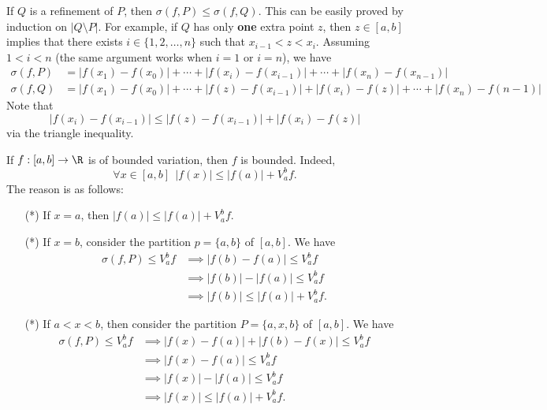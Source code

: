 \begin{remark}
    If \( Q  \) is a refinement of \( P \), then \( \sigma(f,P) \leq \sigma(f,Q) \). This can be easily proved by induction on \( | Q \setminus  P  |  \). For example, if \( Q  \) has only \textbf{one} extra point \( z  \), then \( z \in [a,b] \) implies that there exists \( i \in \{ 1,2, \dots, n  \}  \) such that \( {x}_{i-1 } < z < {x}_{i} \). Assuming \( 1 < i < n  \) (the same argument works when \( i = 1  \) or \( i = n  \)), we have   
    \begin{align*}
        \sigma(f,P) &= | f({x}_{1}) - f({x}_{0}) |  + \cdots + | f({x}_{i}) - f({x}_{i-1}) |  + \cdots + | f({x}_{n}) - f({x}_{n-1}) |  \\
        \sigma(f,Q) &= | f({x}_{1}) - f({x}_{0}) |  + \cdots + | f(z ) - f({x}_{i-1}) |  + | f({x}_{i}) - f(z)  |  + \cdots + | f({x}_{n}) - f(n-1) | 
    \end{align*}
    Note that 
    \[  | f({x}_{i})- f({x}_{i-1}) | \leq | f(z) - f({x}_{i-1}) |  + | f({x}_{i}) - f(z) |  \]
    via the triangle inequality.
\end{remark}

\begin{remark}
    If \( f: [a,b] \to \R  \) is of bounded variation, then \( f  \) is bounded. Indeed,  
    \[  \forall x \in [a,b] \ \ | f(x) |  \leq | f(a) |  + {V}_{a}^{b} f. \]
    The reason is as follows:
    \begin{enumerate}
        \item[(*)] If \( x = a  \), then \( | f(a) |  \leq | f(a) |  + {V}_{a}^{b} f  \).
        \item[(*)] If \( x = b  \), consider the partition \( p = \{  a, b  \}  \) of \( [a,b] \). We have 
            \begin{align*}
                \sigma(f,P) \leq {V}_{a}^{b} f &\implies | f(b) - f(a) |  \leq {V}_{a}^{b} f \\
                                               &\implies | f(b) |  - | f(a) |  \leq {V}_{a}^{b} f \\
                                               &\implies | f(b) |  \leq | f(a) |  + {V}_{a}^{b} f.
            \end{align*}
        \item[(*)] If \( a < x < b  \), then consider the partition \( P = \{  a,x,b \}  \) of \( [a,b] \). We have  
            \begin{align*}
                \sigma(f,P) \leq {V}_{a}^{b} f &\implies | f(x) - f(a) |  + | f(b) - f(x) |  \leq {V}_{a}^{b} f  \\
                                               &\implies | f(x) - f(a) |  \leq {V}_{a}^{b} f \\
                                               &\implies | f(x) |  - | f(a) |  \leq {V}_{a}^{b} f \\
                                               &\implies | f(x) |  \leq | f(a) |  + {V}_{a}^{b} f. 
            \end{align*}
    \end{enumerate}
\end{remark}

